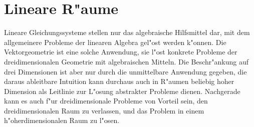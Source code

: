 %
%
%
\chapter{Lineare R"aume\label{chapter-vr}}
Lineare Gleichungssysteme stellen nur das algebraische Hilfsmittel dar,
mit dem allgemeinere Probleme der linearen Algebra gel"ost werden 
k"onnen.
Die Vektorgeometrie ist eine solche Anwendung, sie l"ost konkrete 
Probleme der dreidimensionalen Geometrie mit algebraischen Mitteln.
Die Beschr"ankung auf drei Dimensionen ist aber nur durch die unmittelbare
Anwendung gegeben, die daraus ableitbare Intuition kann durchaus 
auch in R"aumen beliebig hoher Dimension als Leitlinie zur L"osung
abstrakter Probleme dienen. Nachgerade kann es auch f"ur dreidimensionale
Probleme von Vorteil sein, den dreidimensionalen Raum zu verlassen,
und das Problem in einem h"oherdimensionalen Raum zu l"osen.

